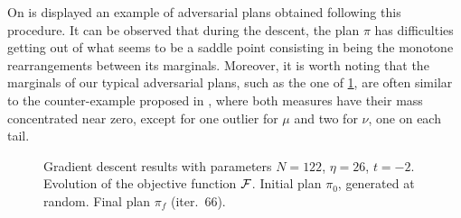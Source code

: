             On  is displayed an example of adversarial plans obtained following this procedure. It can be observed that during the descent, the plan $\pi$ has difficulties getting out of what seems to be a saddle point consisting in being the monotone rearrangements between its marginals. Moreover, it is worth noting that the marginals of our typical adversarial plans, such as the one of \cref{fig:res-GD}, are often similar to the counter-example proposed in \cite{beinert2022assignment}, where both measures have their mass concentrated near zero, except for one outlier for $\mu$ and two for $\nu$, one on each tail.

            \begin{figure}[h]
                \centering
                \begin{subfigure}[b]{.33\linewidth}
                    \centering
                    
                    \vspace{-6mm}
                \end{subfigure}
                \begin{subfigure}[b]{.33\linewidth}
                    \centering
                    
                    \vspace{-6mm}
                \end{subfigure}
                \begin{subfigure}[b]{.33\linewidth}
                    \centering
                    
                    \vspace{-6mm}
                \end{subfigure}
                \caption{Gradient descent results with parameters $N=122$, $\eta=26$, $t=-2$. \capleft Evolution of the objective function $\mathcal{F}$. \capcenter Initial plan $\pi_0$, generated at random. \capright Final plan $\pi_f$ (iter.~66).}
                \label{fig:res-GD}
            \end{figure}

            \newpage

